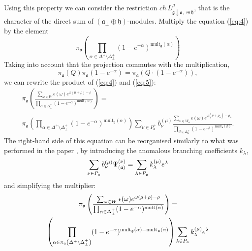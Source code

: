 \documentclass[a4paper,12pt]{article}
\theoremstyle{definition} \newtheorem{Def}{Definition}
\begin{document}
Using this property we can consider the restriction $ch\, L^{\mu}_{\mathfrak{g}\downarrow \mathfrak{a}_{\bot}\oplus \mathfrak{h}}$, that is the character of the direct sum of $\left( \mathfrak{a}_{\bot}\oplus\mathfrak{h}\right) $-modules.
Multiply the equation (\ref{eq:4}) by the element
\begin{equation}
  \label{eq:5}
  \pi_{\mathfrak{a}}\left(\prod_{\alpha\in \Delta^{+}\setminus \Delta^{+}_{\bot}}(1-e^{-\alpha})^{\mathrm{mult}_{\mathfrak{g}}(\alpha)} \right)
\end{equation}
Taking into account that the projection commutes with the multiplication,
\begin{equation}
  \label{eq:6}
  \pi_{\mathfrak{a}} (Q) \pi_{\mathfrak{a}}(1-e^{-\alpha})=\pi_{\mathfrak{a}}\left(Q\cdot (1-e^{-\alpha})\right),
\end{equation}
we can rewrite the
product of (\ref{eq:4}) and (\ref{eq:5}):
\begin{multline}
  \label{eq:7}
  \pi_{\mathfrak{a}}\left(\frac{\sum_{\omega\in W} \epsilon(\omega) e^{\omega(\mu+\rho)-\rho}}{\prod_{\alpha\in\Delta^{+}_{\bot}}(1-e^{-\alpha})^{\mathrm{mult}(\alpha)}}\right) = \\
  \pi_{\mathfrak{a}}\left(\prod_{\alpha\in \Delta^{+}\setminus \Delta^{+}_{\bot}}(1-e^{-\alpha})^{\mathrm{mult}_{\mathfrak{g}}(\alpha)} \right)\sum_{\nu\in P^{+}_{\mathfrak{a}}}b^{(\mu)}_{\nu}
  \frac{\sum_{\omega\in W_{\mathfrak{a}}}\epsilon(\omega)e^{\omega(\nu+\rho_{\mathfrak{a}})-\rho_{\mathfrak{a}}}}{\prod_{\beta\in \Delta_{\mathfrak{a}}^{+}}(1-e^{-\beta})^{\mathrm{mult}_{\mathfrak{a}}(\beta)}}.
\end{multline}
The right-hand side of this equation can be reorganised similarly to what was performed in the paper \cite{ilyin812pbc}, by introducing the anomalous branching coefficients $k_{\lambda}$,
\begin{equation}
  \label{eq:10}
  \sum_{\nu \in P_{\frak{a}}}b_{\nu }^{\left( \mu \right) }\Psi _{\left( \frak{%
        a}\right) }^{\left( \nu \right) }=\sum_{\lambda \in P_{\frak{a}}}k_{\lambda
  }^{\left( \mu \right) }e^{\lambda }
\end{equation}
and simplifying the multiplier:
\begin{multline}
  \label{eq:12}
  \pi_{\mathfrak{a}}\left(\frac{\sum_{\omega\in W} \epsilon(\omega) e^{\omega(\mu+\rho)-\rho}}{\prod_{\alpha\in\Delta^{+}_{\bot}}(1-e^{-\alpha})^{\mathrm{mult}(\alpha)}}\right) = \\
  \left(\prod_{\alpha\in \pi_{\mathfrak{a}}\left(\Delta^{+}\setminus \Delta^{+}_{\bot}\right)}(1-e^{-\alpha})^{{\rm mult}_{\mathfrak{g}}(\alpha)-{\rm mult}_{\mathfrak{a}}(\alpha)} \right)
    \sum_{\lambda \in P_{\frak{a}}}k_{\lambda}^{\left( \mu \right) }e^{\lambda }
\end{multline}
\end{document}
